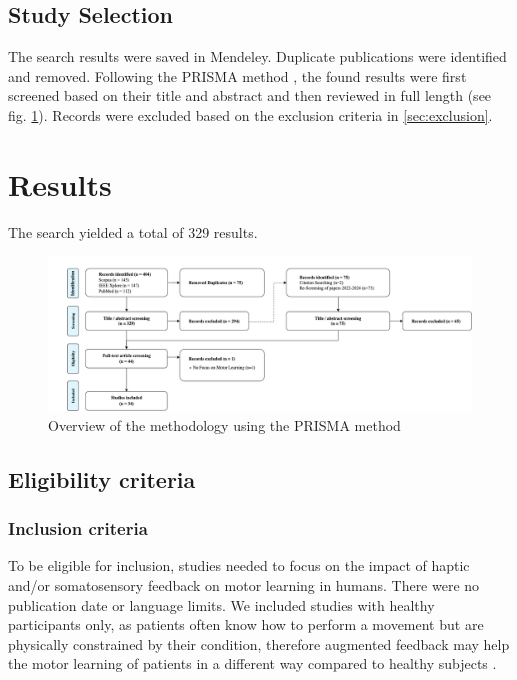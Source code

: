 \documentclass[conference]{IEEEtran}
\begin{document}
\subsection{Study Selection}
The search results were saved in Mendeley. Duplicate publications were identified and removed. Following the PRISMA method \cite{Page2021TheReviews}, the found results were first screened based on their title and abstract and then reviewed in full length (see fig. \ref{fig:prisma}). Records were excluded based on the exclusion criteria in \ref{sec:exclusion}.

\section{Results}

The search yielded a total of 329 results.

\begin{figure}[ht]
    \centering
    \includegraphics[width=\columnwidth]{prisma_overview.png} 
    \caption{Overview of the methodology using the PRISMA method}
    \label{fig:prisma}
\end{figure}



\subsection{Eligibility criteria}
\label{sec:eligibility}
\subsubsection{Inclusion criteria}
To be eligible for inclusion, studies needed to focus on the impact of haptic and/or somatosensory feedback on motor learning in humans. There were no publication date or language limits. We included studies with healthy participants only, as patients often know how to perform a movement but are physically constrained by their condition, therefore augmented feedback may help the motor learning of patients in a different way compared to healthy subjects \cite{Sigrist2013AugmentedReview}.
\end{document}
